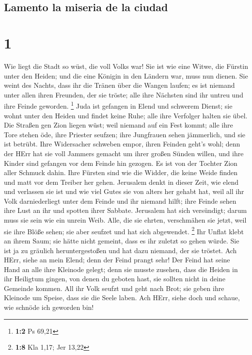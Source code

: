 \hypertarget{lamento-la-miseria-de-la-ciudad}{%
\subsection{Lamento la miseria de la
ciudad}\label{lamento-la-miseria-de-la-ciudad}}

\hypertarget{section}{%
\section{1}\label{section}}

 Wie liegt die Stadt so wüst, die voll Volks war! Sie ist
wie eine Witwe, die Fürstin unter den Heiden; und die eine Königin in
den Ländern war, muss nun dienen.  Sie weint des Nachts,
dass ihr die Tränen über die Wangen laufen; es ist niemand unter allen
ihren Freunden, der sie tröste; alle ihre Nächsten sind ihr untreu und
ihre Feinde geworden. \footnote{\textbf{1:2} Ps 69,21} 
Juda ist gefangen in Elend und schwerem Dienst; sie wohnt unter den
Heiden und findet keine Ruhe; alle ihre Verfolger halten sie übel.
 Die Straßen gen Zion liegen wüst; weil niemand auf ein
Fest kommt; alle ihre Tore stehen öde, ihre Priester seufzen; ihre
Jungfrauen sehen jämmerlich, und sie ist betrübt.  Ihre
Widersacher schweben empor, ihren Feinden geht's wohl; denn der HErr hat
sie voll Jammers gemacht um ihrer großen Sünden willen, und ihre Kinder
sind gefangen vor dem Feinde hin gezogen.  Es ist von der
Tochter Zion aller Schmuck dahin. Ihre Fürsten sind wie die Widder, die
keine Weide finden und matt vor dem Treiber her gehen. 
Jerusalem denkt in dieser Zeit, wie elend und verlassen sie ist und wie
viel Gutes sie von alters her gehabt hat, weil all ihr Volk
darniederliegt unter dem Feinde und ihr niemand hilft; ihre Feinde sehen
ihre Lust an ihr und spotten ihrer Sabbate.  Jerusalem hat
sich versündigt; darum muss sie sein wie ein unrein Weib. Alle, die sie
ehrten, verschmähen sie jetzt, weil sie ihre Blöße sehen; sie aber
seufzet und hat sich abgewendet. \footnote{\textbf{1:8} Kla 1,17; Jer
  13,22}  Ihr Unflat klebt an ihrem Saum; sie hätte nicht
gemeint, dass es ihr zuletzt so gehen würde. Sie ist ja zu gräulich
heruntergestoßen und hat dazu niemand, der sie tröstet. Ach HErr, siehe
an mein Elend; denn der Feind prangt sehr!  Der Feind hat
seine Hand an alle ihre Kleinode gelegt; denn sie musste zusehen, dass
die Heiden in ihr Heiligtum gingen, von denen du geboten hast, sie
sollten nicht in deine Gemeinde kommen.  All ihr Volk
seufzt und geht nach Brot; sie geben ihre Kleinode um Speise, dass sie
die Seele laben. Ach HErr, siehe doch und schaue, wie schnöde ich
geworden bin!

